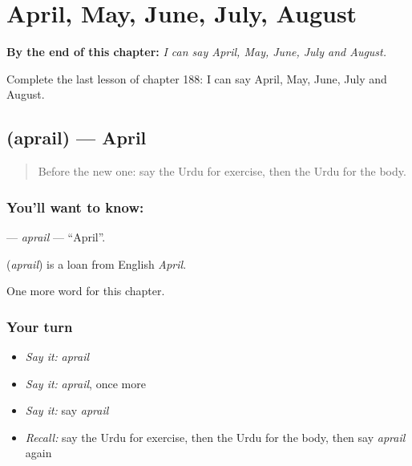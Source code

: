 
\chapter{April, May, June, July, August}
\label{ch:ur-april-may-june-july-august}

\begin{chapteropening}
\textbf{By the end of this chapter:} \emph{I can say April, May, June, July and August.}

Complete the last lesson of chapter 188: I can say April, May, June, July and August.
\end{chapteropening}

\section[\texorpdfstring{\ur{اپریل} (aprail)}{اپریل (aprail)}]{ (aprail) — April}

\label{lesson:UR-C188-aprail}



\begin{quote}
Before the new one: say the Urdu for exercise, then the Urdu for the body.
\end{quote}

\subsection*{You'll want to know: }
\textbf{} — \emph{aprail} — \textquotedblleft{}April\textquotedblright{}.

\begin{cousinweb}
\textbf{} (\emph{aprail}) is a loan from English \emph{April}.
\end{cousinweb}

\begin{grammarlens}[title={What you've built}]
One more word for this chapter.
\end{grammarlens}

\subsection*{Your turn}
\begin{itemize}
\raggedright
  \item \emph{Say it:} \emph{aprail}
  \item \emph{Say it:} \emph{aprail}, once more
  \item \emph{Say it:} say \emph{aprail}
  \item \emph{Recall:} say the Urdu for exercise, then the Urdu for the body, then say \emph{aprail} again
\end{itemize}

